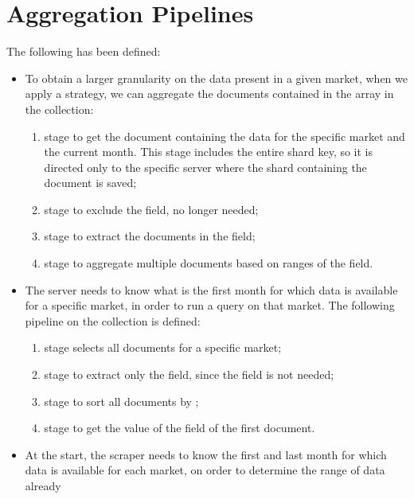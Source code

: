 \section{Aggregation Pipelines}\label{sec:aggregations}

The following  has been defined:

\begin{itemize}
	\item To obtain a larger granularity on the data present in a given
		market, when we apply a strategy, we can aggregate the
		documents contained in the  array in the
		 collection:
		\begin{enumerate}
			\item {} stage to get the document
				containing the data for the specific market and
				the current month. This stage includes the
				entire shard key, so it is directed only to the
				specific server where the shard containing the
				document is saved;
			\item {} stage to exclude the 
				field, no longer needed;
			\item {} stage to extract the documents in
				the  field;
			\item {} stage to aggregate multiple
				documents based on ranges of the  field.
		\end{enumerate}
	\item The server needs to know what is the first month for which data is
		available for a specific market, in order to run a query on that
		market. The following pipeline on the 
		collection is defined:
		\begin{enumerate}
			\item {} stage selects all documents for a
				specific market;
			\item {} stage to extract only the
				 field, since the  field
				is not needed;
			\item {} stage to sort all documents by
				;
			\item {} stage to get the value of the
				 field of the first document.
		\end{enumerate}
	\item At the start, the scraper needs to know the
		first and last month for which data is available for each
		market, on order to determine the range of data already

\end{itemize}
